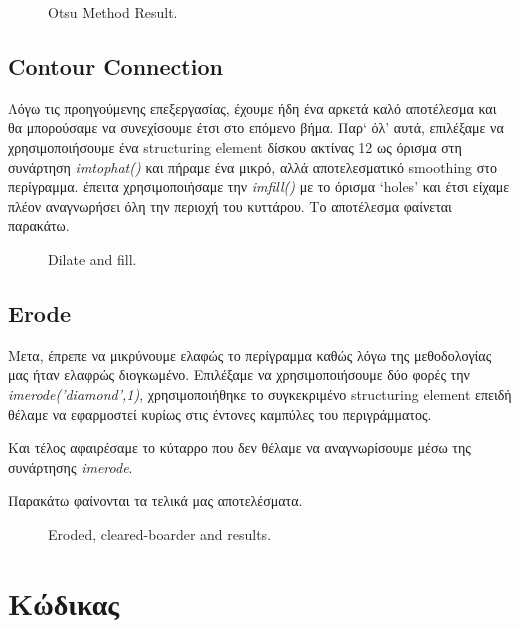 \documentclass[11pt]{scrartcl} %
\begin{document}
\begin{figure}[h]
    \centering
    \caption{Otsu Method Result.}
\end{figure}
\clearpage

\subsection{Contour Connection}
Λόγω τις προηγούμενης επεξεργασίας, έχουμε ήδη ένα αρκετά καλό αποτέλεσμα και θα μπορούσαμε να συνεχίσουμε έτσι στο επόμενο
βήμα. Παρ` όλ' αυτά, επιλέξαμε να χρησιμοποιήσουμε ένα structuring element δίσκου ακτίνας 12 ως όρισμα στη συνάρτηση
\textit{imtophat()} και πήραμε ένα μικρό, αλλά αποτελεσματικό smoothing στο περίγραμμα. έπειτα χρησιμοποιήσαμε την
\textit{imfill()} με το όρισμα `holes' και έτσι είχαμε πλέον αναγνωρήσει όλη την περιοχή του κυττάρου. Το αποτέλεσμα
φαίνεται παρακάτω.

\begin{figure}[h]
    \centering
    \caption{Dilate and fill.}
\end{figure}
\clearpage

\subsection{Erode}
Μετα, έπρεπε να μικρύνουμε ελαφώς το περίγραμμα καθώς λόγω της μεθοδολογίας μας ήταν ελαφρώς διογκωμένο.
Επιλέξαμε να χρησιμοποιήσουμε δύο φορές την \textit{imerode('diamond',1)}, χρησιμοποιήθηκε το συγκεκριμένο
structuring element επειδή θέλαμε να εφαρμοστεί κυρίως στις έντονες καμπύλες του περιγράμματος.

Και τέλος αφαιρέσαμε το κύταρρο που δεν θέλαμε να αναγνωρίσουμε μέσω της συνάρτησης \textit{imerode}.

Παρακάτω φαίνονται τα τελικά μας αποτελέσματα.

\begin{figure}[h]
    \centering
    \caption{Eroded, cleared-boarder and results.}
\end{figure}
\clearpage

\clearpage
\section{Κώδικας}
\end{document}
